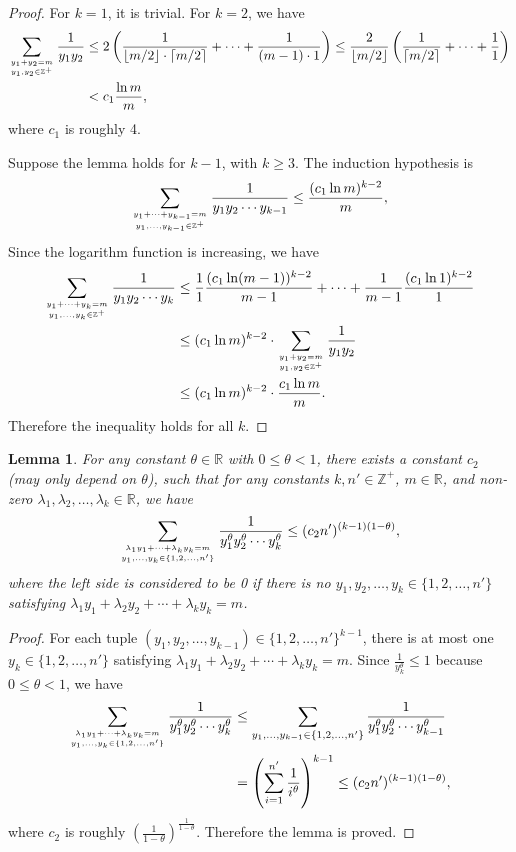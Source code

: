 \documentclass[11pt]{article}
\newtheorem{lem}{Lemma}
\begin{document}
\begin{proof}
For $k=1$, it is trivial. For $k=2$, we have
\begin{align*}
\sum_{y_1+y_2=m \atop y_1,y_2\in\mathbb{Z}^+}\frac{1}{y_1y_2}&\leq2\left(\frac{1}{\lfloor m/2\rfloor\cdot\lceil m/2\rceil}+\cdots+\frac{1}{(m-1)\cdot1}\right)\leq\frac{2}{\lfloor m/2\rfloor}\left(\frac{1}{\lceil m/2\rceil}+\cdots+\frac{1}{1}\right) \\
&<c_1\frac{\ln m}{m},
\end{align*}
where $c_1$ is roughly 4.

Suppose the lemma holds for $k-1$, with $k\ge 3$.
The induction hypothesis is
\[\sum_{y_1+\cdots+y_{k-1}=m \atop y_1,\ldots,y_{k-1}\in\mathbb{Z}^+}\frac{1}{y_1y_2\cdots y_{k-1}}\leq\frac{(c_1\ln m)^{k-2}}{m},\] Since the logarithm function is increasing, we have 
\begin{align*}
\sum_{y_1+\cdots+y_k=m \atop y_1,\ldots,y_k\in\mathbb{Z}^+}\frac{1}{y_1y_2\cdots y_k} & \leq \frac{1}{1}\frac{(c_1\ln(m-1))^{k-2}}{m-1}+\cdots+\frac{1}{m-1}\frac{(c_1\ln 1)^{k-2}}{1} \\
& \leq (c_1\ln m)^{k-2}\cdot\sum_{y_1+y_2=m \atop y_1,y_2\in\mathbb{Z}^+}\frac{1}{y_1y_2} \\
& \leq (c_1\ln m)^{k-2}\cdot \frac{c_1\ln m}{m}.
\end{align*}
Therefore the inequality holds for all $k$.
\end{proof}

\begin{lem} \label{lemma:calc2}
For any constant $\theta\in \mathbb{R}$ with $0\le \theta < 1$,
	there exists a constant $c_2$ (may only depend on $\theta$), such that
	for any constants $k,n'\in\mathbb{Z}^+$, $m\in\mathbb{R}$, and
	non-zero $\lambda_1,\lambda_2,\ldots,\lambda_k\in\mathbb{R}$, we have
\[\sum_{\lambda_1y_1+\cdots+\lambda_ky_k=m \atop y_1,\ldots,y_k\in\{1,2,\ldots,n'\}}\frac{1}{y_1^\theta y_2^\theta \cdots y_k^\theta}\leq(c_2n')^{(k-1)(1-\theta)},\]
where the left side is considered to be 0 if there is no 
	$y_1,y_2,\ldots,y_k\in\{1,2,\ldots,n'\}$ satisfying 
	$\lambda_1y_1+\lambda_2y_2+\cdots+\lambda_ky_k=m$.
\end{lem}

\begin{proof}
For each tuple $(y_1,y_2,\ldots,y_{k-1})\in\{1,2,\ldots,n'\}^{k-1}$, there is at most one $y_k\in\{1,2,\ldots,n'\}$ satisfying $\lambda_1y_1+\lambda_2y_2+\cdots+\lambda_ky_k=m$. 
Since $\frac{1}{y_k^\theta}\leq1$ because $0\le \theta < 1$, we have 
\begin{align*}
\sum_{\lambda_1y_1+\cdots+\lambda_ky_k=m \atop y_1,\ldots,y_k\in\{1,2,\ldots,n'\}}\frac{1}{y_1^\theta y_2^\theta \cdots y_k^\theta}&\leq\sum_{y_1,\ldots,y_{k-1}\in\{1,2,\ldots,n'\}}\frac{1}{y_1^\theta y_2^\theta \cdots y_{k-1}^\theta} \\
&=\left(\sum_{i=1}^{n'}\frac{1}{i^\theta}\right)^{k-1}\leq(c_2n')^{(k-1)(1-\theta)},
\end{align*}
where $c_2$ is roughly $(\frac{1}{1-\theta})^{\frac{1}{1-\theta}}$. Therefore the lemma is proved.
\end{proof}
\end{document}
